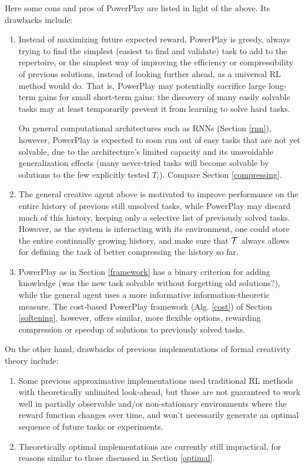 \documentclass{article}
\begin{document}
Here some cons and pros of {\sc PowerPlay} are listed in light of the above.
Its drawbacks include:
\begin{enumerate}
\item
Instead of maximizing future expected reward, {\sc PowerPlay}
is greedy, always trying to find the simplest (easiest to find and validate) task to add to the repertoire,
or the simplest way of improving the efficiency or compressibility of previous solutions,
instead of looking further ahead, as a universal RL method \cite{Schmidhuber:06cs,Schmidhuber:10ieeetamd} would do.
That is, {\sc PowerPlay} may potentially sacrifice large long-term gains for small short-term gains: 
the discovery of many easily solvable tasks may at least temporarily prevent it from learning to solve hard tasks. 

On general computational architectures such as RNNs (Section \ref{rnn}), however, 
{\sc PowerPlay} is expected to soon run out of easy tasks that are not yet solvable,
due to the architecture's limited capacity and its unavoidable generalization effects 
(many never-tried tasks will become solvable by solutions to the few 
explicitly tested $T_i$). Compare Section \ref{compressing}.
\item
The general creative agent above \cite{Schmidhuber:06cs,Schmidhuber:10ieeetamd} is motivated to improve performance on the  
entire history of previous still unsolved tasks, while {\sc PowerPlay} may discard much of this history, keeping only a selective list of previously solved tasks. However, as the system is interacting with its environment, one could store the entire continually growing
history, and make sure that $\cal T$ always allows for defining the task of better compressing the history so far.
\item
{\sc PowerPlay} as in Section \ref{framework} has a binary criterion for  adding knowledge (was the new task solvable without forgetting old solutions?), while the general agent \cite{Schmidhuber:06cs,Schmidhuber:10ieeetamd} uses a more informative information-theoretic measure. The cost-based {\sc PowerPlay}  framework (Alg. \ref{cost}) of Section \ref{softening}, however, offers similar, more flexible options,
rewarding compression or speedup of solutions to previously solved tasks.
\end{enumerate}

\noindent
On the other hand, drawbacks of previous implementations of formal creativity  theory  include:
\begin{enumerate}
\item
Some previous approximative implementations  \cite{Schmidhuber:91singaporecur,Storck:95} 
used traditional RL methods \cite{Kaelbling:96} with theoretically unlimited look-ahead, 
but those are not guaranteed
to work well in partially observable and/or non-stationary environments 
where the reward function changes over time, and won't necessarily
generate an optimal sequence of future tasks or experiments. 
\item
Theoretically optimal implementations
\cite{Schmidhuber:06cs,Schmidhuber:10ieeetamd} are currently still impractical,
for reasons similar to those discussed in Section \ref{optimal}.
\end{enumerate}
\end{document}
